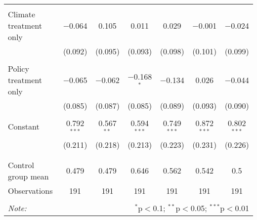 \begin{tabular}{@{\extracolsep{5pt}}lcccccc}
  & & & & & & \\ 
 Climate treatment only & $-$0.064 & 0.105 & 0.011 & 0.029 & $-$0.001 & $-$0.024 \\ 
  & (0.092) & (0.095) & (0.093) & (0.098) & (0.101) & (0.099) \\ 
  & & & & & & \\ 
 Policy treatment only & $-$0.065 & $-$0.062 & $-$0.168$^{*}$ & $-$0.134 & 0.026 & $-$0.044 \\ 
  & (0.085) & (0.087) & (0.085) & (0.089) & (0.093) & (0.090) \\ 
  & & & & & & \\ 
 Constant & 0.792$^{***}$ & 0.567$^{**}$ & 0.594$^{***}$ & 0.749$^{***}$ & 0.872$^{***}$ & 0.802$^{***}$ \\ 
  & (0.211) & (0.218) & (0.213) & (0.223) & (0.231) & (0.226) \\ 
  & & & & & & \\ 
\hline \\[-1.8ex] 
Control group mean & 0.479 & 0.479 & 0.646 & 0.562 & 0.542 & 0.5 \\ 
Observations & 191 & 191 & 191 & 191 & 191 & 191 \\ 
\hline 
\hline \\[-1.8ex] 
\textit{Note:}  & \multicolumn{6}{r}{$^{*}$p$<$0.1; $^{**}$p$<$0.05; $^{***}$p$<$0.01} \\ 
\end{tabular} 

